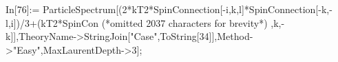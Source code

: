 In[76]:= ParticleSpectrum[(2*kT2*SpinConnection[-i,k,l]*SpinConnection[-k,-l,i])/3+(kT2*SpinCon (*omitted 2037 characters for brevity*) ,k,-k]],TheoryName->StringJoin["Case",ToString[34]],Method->"Easy",MaxLaurentDepth->3];